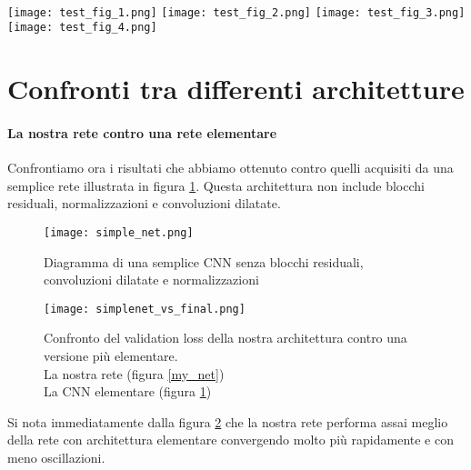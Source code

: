 \noindent{}\\
\texttt{[image: test\_fig\_1.png]}
\texttt{[image: test\_fig\_2.png]}
\texttt{[image: test\_fig\_3.png]}
\texttt{[image: test\_fig\_4.png]}

\section{Confronti tra differenti architetture}
\paragraph{La nostra rete contro una rete elementare}Confrontiamo ora i risultati che abbiamo ottenuto contro quelli acquisiti da una semplice rete illustrata in figura \ref{simple_net}. Questa architettura non include blocchi residuali, normalizzazioni e convoluzioni dilatate.
\begin{figure}[ht]
    \centering
    \texttt{[image: simple\_net.png]}
    \caption{Diagramma di una semplice CNN senza blocchi residuali, convoluzioni dilatate e normalizzazioni}
    \label{simple_net}
\end{figure}

\begin{figure}[ht]
    \centering
    \texttt{[image: simplenet\_vs\_final.png]}
    \caption[Confronto del validation loss della nostra architettura contro una versione più elementare]{
        Confronto del validation loss della nostra architettura contro una versione più elementare. \\
        \quad La nostra rete (figura \ref{my_net})\\
        \quad La CNN elementare (figura \ref{simple_net})
    }
    \label{simplevsfinal}
\end{figure}

Si nota immediatamente dalla figura \ref{simplevsfinal} che la nostra rete performa assai meglio della rete con architettura elementare convergendo molto più rapidamente e con meno oscillazioni.

